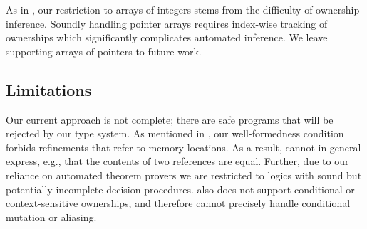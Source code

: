 As in \cite{suenaga2009fractional}, our restriction to arrays of integers
stems from the difficulty of ownership inference. Soundly handling
pointer arrays requires index-wise tracking of ownerships which
significantly complicates automated inference. We leave supporting
arrays of pointers to future work.

\subsection{Limitations}
Our current approach is not complete; there are safe programs that will be
rejected by our type system.
As mentioned in , our well-formedness
condition forbids refinements that refer to memory locations. As a result,
\name cannot in general express, e.g., that the contents of two references are equal.
Further, due to our reliance on automated theorem provers
we are restricted to logics with sound but potentially incomplete decision procedures.
\name also does not support conditional or context-sensitive ownerships, and therefore
cannot precisely handle conditional mutation or aliasing.


